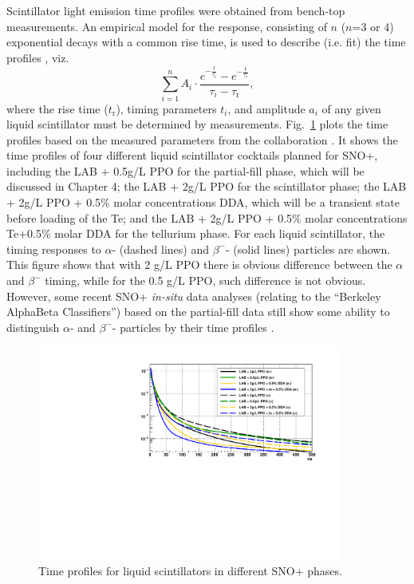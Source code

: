 Scintillator light emission time profiles were obtained from bench-top measurements. An empirical model for the response, consisting of $n$ ($n$=3 or 4) exponential decays with a common rise time, is used to describe (i.e. fit) the time profiles \cite{biller2020slow}, viz.
\begin{equation}
\sum^{n}_{i=1}A_i\cdot\frac{e^{-\frac{t}{\tau_i}}-e^{-\frac{t}{\tau_{\mathrm{r}}}}}{\tau_i-\tau_{\mathrm{r}}},
\end{equation}
where the rise time ($t_{\mathrm{r}}$), timing parameters $t_i$, and amplitude $a_i$ of any given liquid scintillator must be determined by measurements. Fig.~\ref{fig:allTiming} plots the time profiles based on the measured parameters from the collaboration \cite{chicagoTiming,tanner0p5,tannerTeDDA,joshW1}. It shows the time profiles of four different liquid scintillator cocktails planned for SNO+, including the LAB + 0.5g/L PPO for the partial-fill phase, which will be discussed in Chapter 4; the LAB + 2g/L PPO for the scintillator phase; the LAB + 2g/L PPO + 0.5\% molar concentrations DDA, which will be a transient state before loading of the Te; and the LAB + 2g/L PPO + 0.5\% molar concentrations Te+0.5\% molar DDA for the tellurium phase. For each liquid scintillator, the timing responses to $\alpha$- (dashed lines) and $\beta^-$- (solid lines) particles are shown. This figure shows that with 2 g/L PPO there is obvious difference between the $\alpha$ and $\beta^-$ timing, while for the 0.5 g/L PPO, such difference is not obvious. However, some recent SNO+ \emph{in-situ} data analyses (relating to the ``Berkeley AlphaBeta Classifiers'') based on the partial-fill data still show some ability to distinguish $\alpha$- and $\beta^-$- particles by their time profiles \cite{maxSmileyBerkeleyAlphaBeta}. 

\begin{figure}[!htb]
	\centering
	\includegraphics[width=10cm]{plotAllTiming.pdf}
	\caption{Time profiles for liquid scintillators in different SNO+ phases.}
	\label{fig:allTiming}
\end{figure}

